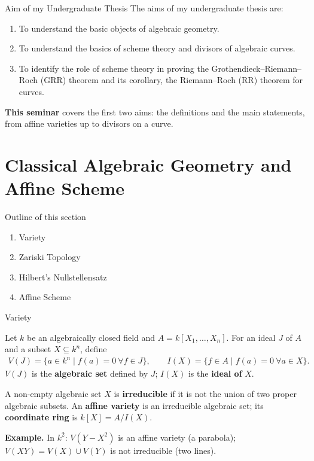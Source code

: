 \documentclass[10pt,aspectratio=1610]{beamer}
\begin{document}
    \begin{frame}{Aim of my Undergraduate Thesis}
        The aims of my undergraduate thesis are:
        \begin{enumerate}
            \item To understand the basic objects of algebraic geometry.
            \item To understand the basics of scheme theory and divisors of algebraic curves.
            \item To identify the role of scheme theory in proving the Grothendieck--Riemann--Roch (GRR) theorem and its corollary, the Riemann--Roch (RR) theorem for curves.
        \end{enumerate}
        \bigskip
        \textbf{This seminar} covers the first two aims: the definitions and the main statements, from affine varieties up to divisors on a curve.
    \end{frame}


    \section{Classical Algebraic Geometry and Affine Scheme}

    \begin{frame}{Outline of this section}
        \begin{enumerate}
            \item Variety
            \item Zariski Topology
            \item Hilbert's Nullstellensatz
            \item Affine Scheme
        \end{enumerate}
    \end{frame}

    \begin{frame}{Variety}
        \begin{definition}
            Let $k$ be an algebraically closed field and $A = k[X_1, \ldots, X_n]$. For an ideal $J$ of $A$ and a subset $X \subseteq k^n$, define
            \begin{align*}
                V(J) = \{a \in k^n \mid f(a)=0 \ \forall f \in J\}, \qquad I(X) = \{f \in A \mid f(a) = 0 \ \forall a \in X\}.
            \end{align*}
            $V(J)$ is the \textbf{algebraic set} defined by $J$; $I(X)$ is the \textbf{ideal of} $X$.
        \end{definition}
        \begin{definition}
            A non-empty algebraic set $X$ is \textbf{irreducible} if it is not the union of two proper algebraic subsets. An \textbf{affine variety} is an irreducible algebraic set; its \textbf{coordinate ring} is $k[X] = A / I(X)$.
        \end{definition}
        \textbf{Example.} In $k^2$: $V(Y - X^2)$ is an affine variety (a parabola); $V(XY) = V(X) \cup V(Y)$ is not irreducible (two lines).
    \end{frame}
\end{document}
